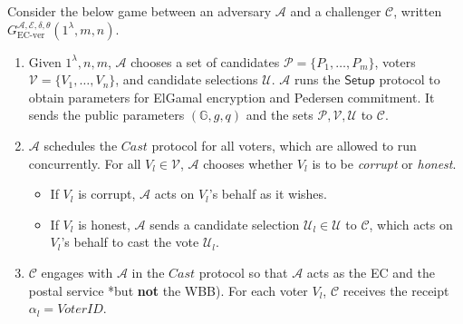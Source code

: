 \documentclass[12pt,a4paper]{article}
\theoremstyle{definition}
\newcommand{\VoterID}{\mathit{VoterID}}
\begin{document}
\begin{definition}[EC Verifiability]
    Consider the below game between an adversary $\mathcal{A}$ and a challenger $\mathcal{C}$, written $G_\text{EC-ver}^{\mathcal{A},\mathcal{E},\delta,\theta}(1^\lambda, m, n)$.
    \begin{enumerate}
        \item Given $1^\lambda, n, m$, $\mathcal{A}$ chooses a set of candidates $\mathcal{P}=\{P_1,\ldots,P_m\}$, voters $\mathcal{V}=\{V_1,\ldots,V_n\}$, and candidate selections $\mathcal{U}$. $\mathcal{A}$ runs the $\mathsf{Setup}$ protocol to obtain parameters for ElGamal encryption and Pedersen commitment. It sends the public parameters $(\mathbb{G}, g, q)$ and the sets $\mathcal{P}, \mathcal{V}, \mathcal{U}$ to $\mathcal{C}$.
        
        \item $\mathcal{A}$ schedules the $\mathit{Cast}$ protocol for all voters, which are allowed to run concurrently. For all $V_l\in\mathcal{V}$, $\mathcal{A}$ chooses whether $V_l$ is to be \textit{corrupt} or \textit{honest}.
        \begin{itemize}
            \item If $V_l$ is corrupt, $\mathcal{A}$ acts on $V_l$'s behalf as it wishes.
            \item If $V_l$ is honest, $\mathcal{A}$ sends a candidate selection $\mathcal{U}_l\in\mathcal{U}$ to $\mathcal{C}$, which acts on $V_l$'s behalf to cast the vote $\mathcal{U}_l$.
        \end{itemize}

        \item $\mathcal{C}$ engages with $\mathcal{A}$ in the $\mathit{Cast}$ protocol so that $\mathcal{A}$ acts as the EC and the postal service *but \textbf{not} the WBB). For each voter $V_l$, $\mathcal{C}$ receives the receipt $\alpha_l=\VoterID$.


\end{enumerate}
\end{definition}
\end{document}
